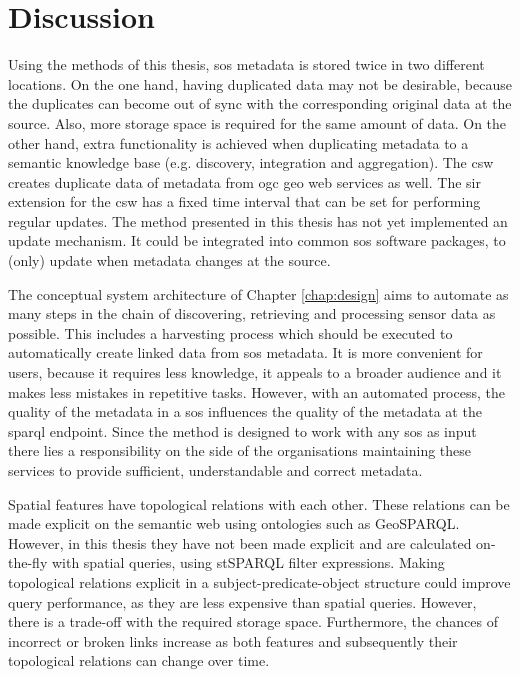 \section{Discussion}
\label{discussion}

Using the methods of this thesis, \ac{sos} metadata is stored twice in two different locations. On the one hand, having duplicated data may not be desirable, because the duplicates can become out of sync with the corresponding original data at the source. Also, more storage space is required for the same amount of data. On the other hand, extra functionality is achieved when duplicating metadata to a semantic knowledge base (e.g. discovery, integration and aggregation). The \ac{csw} creates duplicate data of metadata from \ac{ogc} geo web services as well. The \acs{sir} extension for the \ac{csw} has a fixed time interval that can be set for performing regular updates. The method presented in this thesis has not yet implemented an update mechanism. It could be integrated into common \ac{sos} software packages, to (only) update when metadata changes at the source. 

The conceptual system architecture of Chapter \ref{chap:design} aims to automate as many steps in the chain of discovering, retrieving and processing sensor data as possible. This includes a harvesting process which should be executed to automatically create linked data from \ac{sos} metadata. It is more convenient for users, because it requires less knowledge, it appeals to a broader audience and it makes less mistakes in repetitive tasks. However, with an automated process, the quality of the metadata in a \ac{sos} influences the quality of the metadata at the \ac{sparql} endpoint. Since the method is designed to work with any \ac{sos} as input there lies a responsibility on the side of the organisations maintaining these services to provide sufficient, understandable and correct metadata.   

Spatial features have topological relations with each other. These relations can be made explicit on the semantic web using ontologies such as GeoSPARQL. However, in this thesis they have not been made explicit and are calculated on-the-fly with spatial queries, using stSPARQL filter expressions. Making topological relations explicit in a subject-predicate-object structure could improve query performance, as they are less expensive than spatial queries. However, there is a trade-off with the required storage space. Furthermore, the chances of incorrect or broken links increase as both features and subsequently their topological relations can change over time. 

